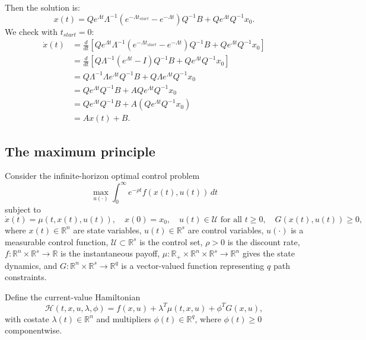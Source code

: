 \documentclass[../../lecture_notes.tex]{subfiles}
\begin{document}
Then the solution is:
\begin{equation*}
  x(t)=Qe^{\Lambda t}\Lambda^{-1}\left( e^{-\Lambda t_{start}}-e^{-\Lambda t}\right) Q^{-1}B+Qe^{\Lambda t}Q^{-1}x_{0}.
\end{equation*}
We check with $t_{start}=0$:
\begin{align*}
  \dot{x}(t) &=\frac{d}{dt}\left[ Qe^{\Lambda t}\Lambda^{-1}\left( e^{-\Lambda t_{start}}-e^{-\Lambda t}\right) Q^{-1}B+Qe^{\Lambda t}Q^{-1}x_{0}\right] \\
  &=\frac{d}{dt}\left[ Q\Lambda^{-1}\left( e^{\Lambda t}-I\right) Q^{-1}B+Qe^{\Lambda t}Q^{-1}x_{0}\right] \\
  &=Q\Lambda^{-1}\Lambda e^{\Lambda t}Q^{-1}B+Q\Lambda e^{\Lambda t}Q^{-1}x_{0} \\
  &=Qe^{\Lambda t}Q^{-1}B+AQe^{\Lambda t}Q^{-1}x_{0} \\
  &=Qe^{\Lambda t}Q^{-1}B+A\left( Qe^{\Lambda t}Q^{-1}x_{0}\right) \\
  &=Ax(t)+B.
\end{align*}

\subsection{The maximum principle}

Consider the infinite-horizon optimal control problem
\begin{equation*}
  \max_{u(\cdot)} \int_{0}^{\infty} e^{-\rho t} f(x(t),u(t)) \, dt
\end{equation*}
subject to
\begin{equation*}
  \dot{x}(t)=\mu(t,x(t),u(t)), \quad x(0)=x_{0}, \quad u(t)\in\mathcal{U} \text{ for all } t \ge 0, \quad G(x(t),u(t))\ge 0,
\end{equation*}
where $x(t)\in\mathbb{R}^{n}$ are state variables, $u(t)\in\mathbb{R}^{s}$ are control variables, $u(\cdot)$ is a measurable control function, $\mathcal{U}\subset\mathbb{R}^{s}$ is the control set, $\rho>0$ is the discount rate, $f:\mathbb{R}^{n}\times\mathbb{R}^{s}\to\mathbb{R}$ is the instantaneous payoff, $\mu:\mathbb{R}_{+}\times\mathbb{R}^{n}\times\mathbb{R}^{s}\to\mathbb{R}^{n}$ gives the state dynamics, and $G:\mathbb{R}^{n}\times\mathbb{R}^{s}\to\mathbb{R}^{q}$ is a vector-valued function representing $q$ path constraints.

Define the current-value Hamiltonian
\begin{equation*}
  \mathcal{H}(t,x,u,\lambda,\phi)=f(x,u)+\lambda^{T}\mu(t,x,u)+\phi^{T}G(x,u),
\end{equation*}
with costate $\lambda(t)\in\mathbb{R}^{n}$ and multipliers $\phi(t)\in\mathbb{R}^{q}$, where $\phi(t)\ge 0$ componentwise.
\end{document}
